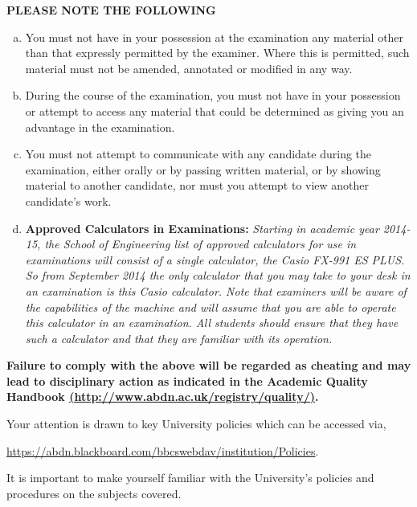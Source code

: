 \documentclass[12pts,a4paper,amsmath,amssymb,floatfix]{article}%
\begin{document}
{\large {\bf PLEASE NOTE THE FOLLOWING}}
\begin{enumerate}[(a)]
\item You must not have in your possession at the examination any material other than that expressly permitted by the examiner. Where this is permitted, such material must not be amended, annotated or modified in any way.
\item During the course of the examination, you must not have in your possession or attempt to access any material that could be determined as giving you an advantage in the examination.
\item You must not attempt to communicate with any candidate during the examination, either orally or by passing written material, or by showing material to another candidate, nor must you attempt to view another candidate's work.
\item {\bf Approved Calculators in Examinations:}  {\it Starting in academic year 2014-15, the School of Engineering list of approved calculators for use in examinations will consist of a single calculator, the Casio FX-991 ES PLUS.  So from September 2014 the only calculator that you may take to your desk in an examination is this Casio calculator.  Note that examiners will be aware of the capabilities of the machine and will assume that you are able to operate this calculator in an examination.  All students should ensure that they have such a calculator and that they are familiar with its operation.}
\end{enumerate}

\bigskip

{\bf Failure to comply with the above will be regarded as cheating and may lead to disciplinary action as indicated in the Academic Quality Handbook \href{http://www.abdn.ac.uk/registry/quality/}{(http://www.abdn.ac.uk/registry/quality/)}. 

\medskip

Your attention is drawn to key University policies which can be accessed via,
\begin{center}
\href{https://abdn.blackboard.com/bbcswebdav/institution/Policies}{https://abdn.blackboard.com/bbcswebdav/institution/Policies}.
\end{center}
It is important to make yourself familiar with the University's policies and procedures on the subjects covered.}


\end{document}
